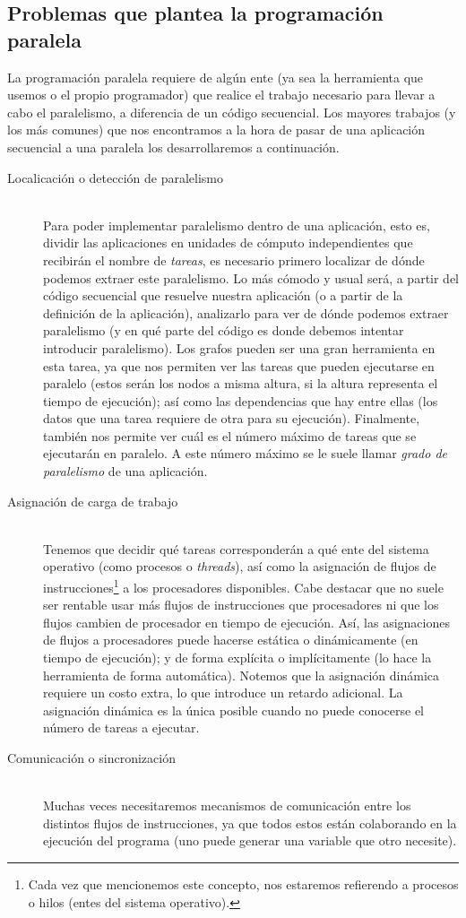 \subsection{Problemas que plantea la programación paralela}
La programación paralela requiere de algún ente (ya sea la herramienta que usemos o el propio programador) que realice el trabajo necesario para llevar a cabo el paralelismo, a diferencia de un código secuencial. Los mayores trabajos (y los más comunes) que nos encontramos a la hora de pasar de una aplicación secuencial a una paralela los desarrollaremos a continuación.

\begin{description}
    \item [Localicación o detección de paralelismo]~\\
        Para poder implementar paralelismo dentro de una aplicación, esto es, dividir las aplicaciones en unidades de cómputo independientes que recibirán el nombre de \emph{tareas}, es necesario primero localizar de dónde podemos extraer este paralelismo. Lo más cómodo y usual será, a partir del código secuencial que resuelve nuestra aplicación (o a partir de la definición de la aplicación), analizarlo para ver de dónde podemos extraer paralelismo (y en qué parte del código es donde debemos intentar introducir paralelismo). Los grafos pueden ser una gran herramienta en esta tarea, ya que nos permiten ver las tareas que pueden ejecutarse en paralelo (estos serán los nodos a misma altura, si la altura representa el tiempo de ejecución); así como las dependencias que hay entre ellas (los datos que una tarea requiere de otra para su ejecución). Finalmente, también nos permite ver cuál es el número máximo de tareas que se ejecutarán en paralelo. A este número máximo se le suele llamar \emph{grado de paralelismo} de una aplicación.
    \item [Asignación de carga de trabajo]~\\
        Tenemos que decidir qué tareas corresponderán a qué ente del sistema operativo (como procesos o \emph{threads}), así como la asignación de flujos de instrucciones\footnote{Cada vez que mencionemos este concepto, nos estaremos refierendo a procesos o hilos (entes del sistema operativo).} a los procesadores disponibles. Cabe destacar que no suele ser rentable usar más flujos de instrucciones que procesadores ni que los flujos cambien de procesador en tiempo de ejecución. Así, las asignaciones de flujos a procesadores puede hacerse estática o dinámicamente (en tiempo de ejecución); y de forma explícita o implícitamente (lo hace la herramienta de forma automática). Notemos que la asignación dinámica requiere un costo extra, lo que introduce un retardo adicional. La asignación dinámica es la única posible cuando no puede conocerse el número de tareas a ejecutar. 
    \item [Comunicación o sincronización]~\\
        Muchas veces necesitaremos mecanismos de comunicación entre los distintos flujos de instrucciones, ya que todos estos están colaborando en la ejecución del programa (uno puede generar una variable que otro necesite). 
\end{description}

